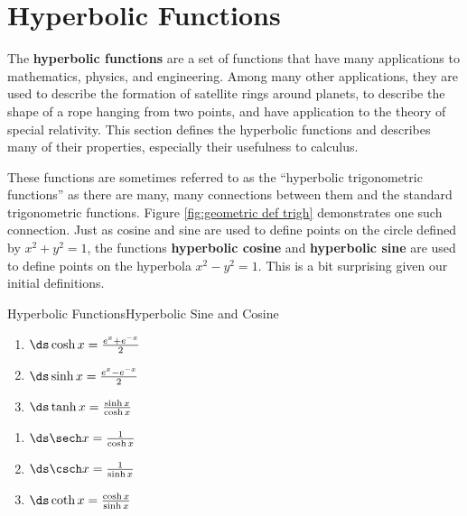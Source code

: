 \section{Hyperbolic Functions}{}{}\label{sec:hyperbolic functions}

The \textbf{hyperbolic functions} are a set of functions that have many applications to mathematics, physics, and engineering. Among many other applications, they are used to describe the formation of satellite rings around planets, to describe the shape of a rope hanging from two points, and have application to the theory of special relativity. This section defines the hyperbolic functions and describes many of their properties, especially their usefulness to calculus.

These functions are sometimes referred to as the ``hyperbolic trigonometric functions'' as there are many, many connections between them and the standard trigonometric functions. Figure \ref{fig:geometric def trigh} demonstrates one such connection. Just as cosine and sine are used to define points on the circle defined by $x^2+y^2=1$, the functions \textbf{hyperbolic cosine} and \textbf{hyperbolic sine} are used to define points on the hyperbola $x^2-y^2=1$. This is a bit surprising given our initial definitions.

\begin{definition}{Hyperbolic Functions}{Hyperbolic Sine and Cosine}
\label{def:hyperbolic_functions}
\begin{minipage}{.5\textwidth}
\begin{enumerate}
\item		$\ds \cosh x = \frac{e^x+e^{-x}}2$
\item		$\ds \sinh x = \frac{e^x-e^{-x}}2$
\item		$\ds \tanh x = \frac{\sinh x}{\cosh x}$
\end{enumerate}
\end{minipage}
\begin{minipage}{.5\textwidth}
\begin{enumerate}\addtocounter{enumi}{3}
\item		$\ds \sech x = \frac{1}{\cosh x}$
\item		$\ds \csch x = \frac{1}{\sinh x}$
\item		$\ds \coth x = \frac{\cosh x}{\sinh x}$
\end{enumerate}
\end{minipage}
\end{definition}

